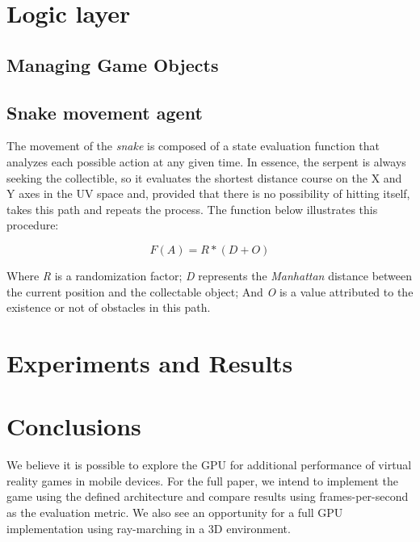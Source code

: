 \documentclass[runningheads]{llncs}
\begin{document}
\section{Logic layer}

\subsection{Managing Game Objects}

\subsection{Snake movement agent} \label{sec:agent}

The movement of the \textit{snake} is composed of a state evaluation function that analyzes each possible action at any given time. In essence, the serpent is always seeking  the collectible, so it evaluates the shortest distance course on the X and Y axes in the UV space and, provided that there is no possibility of hitting itself, takes this path and repeats the process. The function below illustrates this procedure:

\begin{equation}
F(A) = R * (D + O)
\label{equation11}
\end{equation}

Where \textit{R} is a randomization factor; \textit{D} represents the \textit{Manhattan} distance between the current position and the collectable object; And \textit{O} is a value attributed to the existence or not of obstacles in this path.

\section{Experiments and Results}


\section{Conclusions}
We believe it is possible to explore the GPU for additional performance of virtual reality games in mobile devices. For the full paper, we intend to implement the game using the defined architecture and compare results using frames-per-second as the evaluation metric. We also see an opportunity for a full GPU implementation using ray-marching in a 3D environment.
%
%
%


\end{document}
